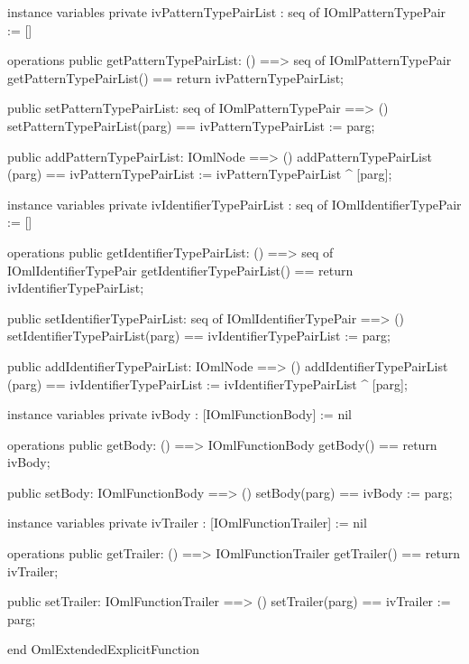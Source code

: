 \begin{vdm_al}
instance variables
  private ivPatternTypePairList : seq of IOmlPatternTypePair := []

operations
  public getPatternTypePairList: () ==> seq of IOmlPatternTypePair
  getPatternTypePairList() == return ivPatternTypePairList;

  public setPatternTypePairList: seq of IOmlPatternTypePair ==> ()
  setPatternTypePairList(parg) == ivPatternTypePairList := parg;

  public addPatternTypePairList: IOmlNode ==> ()
  addPatternTypePairList (parg) == ivPatternTypePairList := ivPatternTypePairList ^ [parg];

instance variables
  private ivIdentifierTypePairList : seq of IOmlIdentifierTypePair := []

operations
  public getIdentifierTypePairList: () ==> seq of IOmlIdentifierTypePair
  getIdentifierTypePairList() == return ivIdentifierTypePairList;

  public setIdentifierTypePairList: seq of IOmlIdentifierTypePair ==> ()
  setIdentifierTypePairList(parg) == ivIdentifierTypePairList := parg;

  public addIdentifierTypePairList: IOmlNode ==> ()
  addIdentifierTypePairList (parg) == ivIdentifierTypePairList := ivIdentifierTypePairList ^ [parg];

instance variables
  private ivBody : [IOmlFunctionBody] := nil

operations
  public getBody: () ==> IOmlFunctionBody
  getBody() == return ivBody;

  public setBody: IOmlFunctionBody ==> ()
  setBody(parg) == ivBody := parg;

instance variables
  private ivTrailer : [IOmlFunctionTrailer] := nil

operations
  public getTrailer: () ==> IOmlFunctionTrailer
  getTrailer() == return ivTrailer;

  public setTrailer: IOmlFunctionTrailer ==> ()
  setTrailer(parg) == ivTrailer := parg;

end OmlExtendedExplicitFunction
\end{vdm_al}

